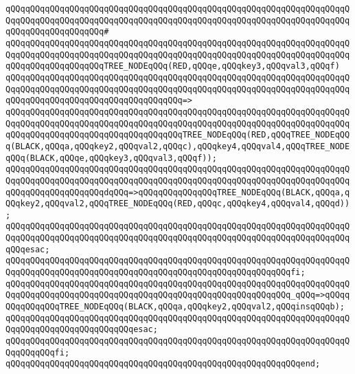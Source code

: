 \verb|qQQqqQQqqQQqqQQqqQQqqQQqqQQqqQQqqQQqqQQqqQQqqQQqqQQqqQQqqQQqqQQqqQQqqQQqqQQqqQQqqQQqqQQqqQQqqQQqqQQqqQQqqQQqqQQqqQQqqQQqqQQqqQQqqQQqqQQqqQQqqQQqqQQqqQQqqQQqqQQq#|\newline
\verb|qQQqqQQqqQQqqQQqqQQqqQQqqQQqqQQqqQQqqQQqqQQqqQQqqQQqqQQqqQQqqQQqqQQqqQQqqQQqqQQqqQQqqQQqqQQqqQQqqQQqqQQqqQQqqQQqqQQqqQQqqQQqqQQqqQQqqQQqqQQqqQQqqQQqqQQqqQQqqQQqTREE_NODEqQQq(RED,qQQqe,qQQqkey3,qQQqval3,qQQqf)|\newline
\verb|qQQqqQQqqQQqqQQqqQQqqQQqqQQqqQQqqQQqqQQqqQQqqQQqqQQqqQQqqQQqqQQqqQQqqQQqqQQqqQQqqQQqqQQqqQQqqQQqqQQqqQQqqQQqqQQqqQQqqQQqqQQqqQQqqQQqqQQqqQQqqQQqqQQqqQQqqQQqqQQqqQQqqQQqqQQqqQQq=>|\newline
\verb|qQQqqQQqqQQqqQQqqQQqqQQqqQQqqQQqqQQqqQQqqQQqqQQqqQQqqQQqqQQqqQQqqQQqqQQqqQQqqQQqqQQqqQQqqQQqqQQqqQQqqQQqqQQqqQQqqQQqqQQqqQQqqQQqqQQqqQQqqQQqqQQqqQQqqQQqqQQqqQQqqQQqqQQqqQQqqQQqTREE_NODEqQQq(RED,qQQqTREE_NODEqQQq(BLACK,qQQqa,qQQqkey2,qQQqval2,qQQqc),qQQqkey4,qQQqval4,qQQqTREE_NODEqQQq(BLACK,qQQqe,qQQqkey3,qQQqval3,qQQqf));|\newline
\newline
\verb|qQQqqQQqqQQqqQQqqQQqqQQqqQQqqQQqqQQqqQQqqQQqqQQqqQQqqQQqqQQqqQQqqQQqqQQqqQQqqQQqqQQqqQQqqQQqqQQqqQQqqQQqqQQqqQQqqQQqqQQqqQQqqQQqqQQqqQQqqQQqqQQqqQQqqQQqqQQqqQQqdqQQq=>qQQqqQQqqQQqqQQqTREE_NODEqQQq(BLACK,qQQqa,qQQqkey2,qQQqval2,qQQqTREE_NODEqQQq(RED,qQQqc,qQQqkey4,qQQqval4,qQQqd));|\newline
\verb|qQQqqQQqqQQqqQQqqQQqqQQqqQQqqQQqqQQqqQQqqQQqqQQqqQQqqQQqqQQqqQQqqQQqqQQqqQQqqQQqqQQqqQQqqQQqqQQqqQQqqQQqqQQqqQQqqQQqqQQqqQQqqQQqqQQqqQQqqQQqqQQqesac;|\newline
\verb|qQQqqQQqqQQqqQQqqQQqqQQqqQQqqQQqqQQqqQQqqQQqqQQqqQQqqQQqqQQqqQQqqQQqqQQqqQQqqQQqqQQqqQQqqQQqqQQqqQQqqQQqqQQqqQQqqQQqqQQqqQQqqQQqfi;|\newline
\newline
\verb|qQQqqQQqqQQqqQQqqQQqqQQqqQQqqQQqqQQqqQQqqQQqqQQqqQQqqQQqqQQqqQQqqQQqqQQqqQQqqQQqqQQqqQQqqQQqqQQqqQQqqQQqqQQqqQQqqQQqqQQqqQQqqQQq_qQQq=>qQQqqQQqqQQqqQQqTREE_NODEqQQq(BLACK,qQQqa,qQQqkey2,qQQqval2,qQQqinsqQQqb);|\newline
\verb|qQQqqQQqqQQqqQQqqQQqqQQqqQQqqQQqqQQqqQQqqQQqqQQqqQQqqQQqqQQqqQQqqQQqqQQqqQQqqQQqqQQqqQQqqQQqqQQqesac;|\newline
\verb|qQQqqQQqqQQqqQQqqQQqqQQqqQQqqQQqqQQqqQQqqQQqqQQqqQQqqQQqqQQqqQQqqQQqqQQqqQQqqQQqfi;|\newline
\verb|qQQqqQQqqQQqqQQqqQQqqQQqqQQqqQQqqQQqqQQqqQQqqQQqqQQqqQQqqQQqend;|\newline
